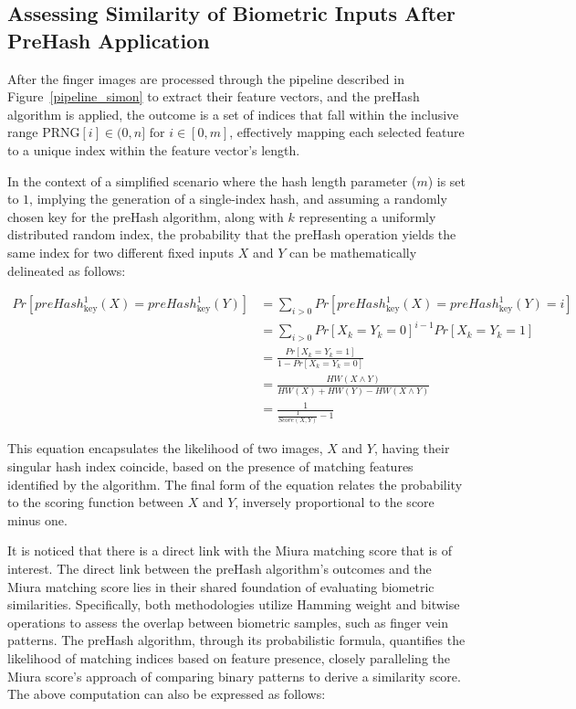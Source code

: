 \subsection{Assessing Similarity of Biometric Inputs After PreHash Application}
\label{sec:mu}

After the finger images are processed through the pipeline described in Figure~\ref{pipeline_simon} to extract their feature vectors, and the preHash algorithm is applied, the outcome is a set of indices that fall within the inclusive range \(\text{PRNG}[i] \in (0, n] \text{ for } i \in [0, m]\), effectively mapping each selected feature to a unique index within the feature vector's length.

In the context of a simplified scenario where the hash length parameter (\(m\)) is set to \(1\), implying the generation of a single-index hash, and assuming a randomly chosen key for the preHash algorithm, along with \(k\) representing a uniformly distributed random index, the probability that the preHash operation yields the same index for two different fixed inputs \(X\) and \(Y\) can be mathematically delineated as follows:


\begin{equation} \label{eq:preHash1}
    \begin{aligned}
        Pr[preHash_{\text{key}}^1(X) = preHash_{\text{key}}^1(Y)] &= \sum_{i > 0} Pr[preHash_{\text{key}}^1(X) = preHash_{\text{key}}^1(Y) = i]\\
        &= \sum_{i > 0} Pr[X_k = Y_k = 0]^{i - 1} Pr[X_k = Y_k = 1]\\
        &= \frac{Pr[X_k = Y_k = 1]}{1 - Pr[X_k = Y_k = 0]}\\
        &= \frac{HW(X \land Y)}{HW(X) + HW(Y) - HW(X \land Y)}\\
        &= \frac{1}{\frac{1}{Score(X, Y)} - 1}
    \end{aligned}
\end{equation}

This equation encapsulates the likelihood of two images, \(X\) and \(Y\), having their singular hash index coincide, based on the presence of matching features identified by the algorithm. The final form of the equation relates the probability to the scoring function between \(X\) and \(Y\), inversely proportional to the score minus one.

It is noticed that there is a direct link with the Miura matching score that is of interest. The direct link between the preHash algorithm's outcomes and the Miura matching score lies in their shared foundation of evaluating biometric similarities. Specifically, both methodologies utilize Hamming weight and bitwise operations to assess the overlap between biometric samples, such as finger vein patterns. The preHash algorithm, through its probabilistic formula, quantifies the likelihood of matching indices based on feature presence, closely paralleling the Miura score's approach of comparing binary patterns to derive a similarity score. The above computation can also be expressed as follows:

